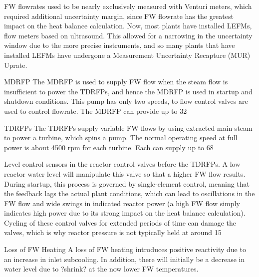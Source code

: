 \documentclass[10pt]{article}
\begin{document}
FW flowrates used to be nearly exclusively measured with Venturi meters, which required additional uncertainty margin, since FW flowrate has the greatest impact on the heat balance calculation. Now, most plants have installed LEFMs, flow meters based on ultrasound. This allowed for a narrowing in the uncertainty window due to the more precise instruments, and so many plants that have installed LEFMs have undergone a Measurement Uncertainty Recapture (MUR) Uprate. 

MDRFP
The MDRFP is used to supply FW flow when the steam flow is insufficient to power the TDRFPs, and hence the MDRFP is used in startup and shutdown conditions. This pump has only two speeds, to flow control valves are used to control flowrate. The MDRFP can provide up to 32%

TDRFPs
The TDRFPs supply variable FW flows by using extracted main steam to power a turbine, which spins a pump. The normal operating speed at full power is about 4500 rpm for each turbine. Each can supply up to 68%

Level control sensors in the reactor control valves before the TDRFPs. A low reactor water level will manipulate this valve so that a higher FW flow results. During startup, this process is governed by single-element control, meaning that the feedback lags the actual plant conditions, which can lead to oscillations in the FW flow and wide swings in indicated reactor power (a high FW flow simply indicates high power due to its strong impact on the heat balance calculation). Cycling of these control valves for extended periods of time can damage the valves, which is why reactor pressure is not typically held at around 15%

Loss of FW Heating
A loss of FW heating introduces positive reactivity due to an increase in inlet subcooling. In addition, there will initially be a decrease in water level due to ?shrink? at the now lower FW temperatures. 
\end{document}
